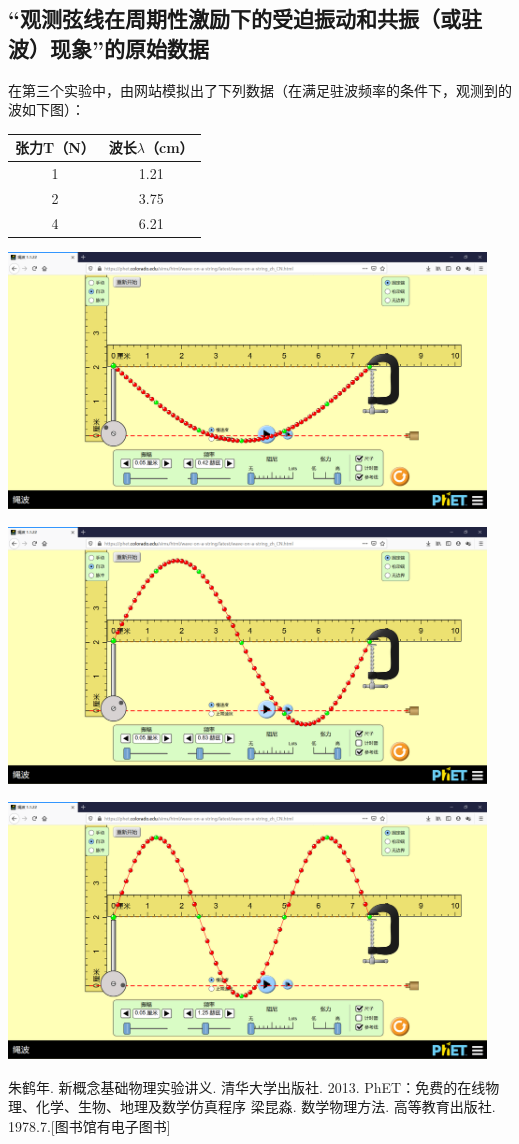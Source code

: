 \documentclass[UTF8]{ctexart}
\begin{document}
\subsection{“观测弦线在周期性激励下的受迫振动和共振（或驻波）现象”的原始数据}
在第三个实验中，由网站模拟出了下列数据（在满足驻波频率的条件下，观测到的波如下图）：
\begin{table}[htbp!] 
\centering 
\begin{tabular}{|c|c|} 
\hline 
张力T（N） &  波长$\lambda$（cm）  \\ 
\hline 
1 & 1.21 \\ 
\hline
2 & 3.75 \\ 
\hline 
4 & 6.21  \\  
\hline
\end{tabular} 
\end{table}
\begin{center} 
\includegraphics[width=0.95\textwidth]{A.png} 
\end{center}
\begin{center} 
\includegraphics[width=0.95\textwidth]{B.png} 
\end{center}
\begin{center} 
\includegraphics[width=0.95\textwidth]{C.png} 
\end{center}
\begin{thebibliography}{123456} 
 朱鹤年. 新概念基础物理实验讲义. 清华大学出版社. 2013. 
 PhET：免费的在线物理、化学、生物、地理及数学仿真程序
 梁昆淼. 数学物理方法. 高等教育出版社. 1978.7.[图书馆有电子图书] 
\end{thebibliography}
\end{document}
